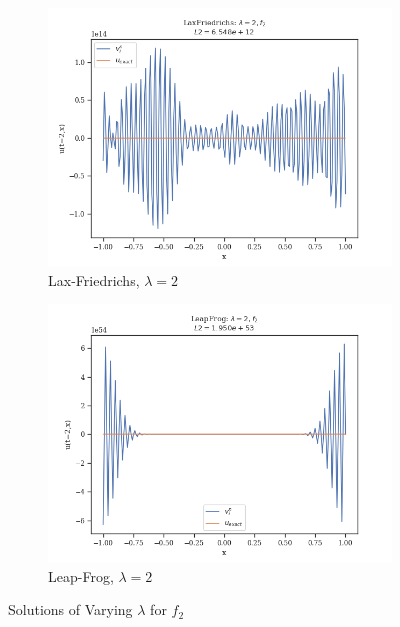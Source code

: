 \begin{figure}
\begin{subfigure}{0.3\linewidth}
        \includegraphics[width=\linewidth]{figures/LaxFriedrichs/LaxFriedrichs_lambda=2,f2}
        \caption{Lax-Friedrichs, $\lambda =2$}
    \end{subfigure}
    \hfill
    \begin{subfigure}{0.3\linewidth}
        \centering
        \includegraphics[width=\linewidth]{figures/LeapFrog/LeapFrog_lambda=2,f2}
        \caption{Leap-Frog, $\lambda =2$}
    \end{subfigure}
    \hfill

    \caption{Solutions of Varying $\lambda$ for $f_2$}
    \label{f2 figures}

\end{figure}
\appendix


